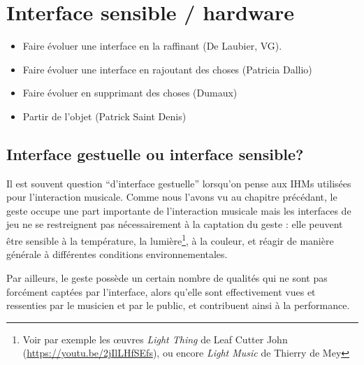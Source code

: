 %
\chapter{Interface sensible / hardware}
\label{ch:interfaces}



\vspace{-1em}
\begin{itemize}[noitemsep]
\item Faire évoluer une interface en la raffinant (De Laubier, VG).
\item Faire évoluer une interface en rajoutant des choses (Patricia Dallio)
\item Faire évoluer en supprimant des choses (Dumaux)
\item Partir de l'objet (Patrick Saint Denis)
\end{itemize}

\section{Interface gestuelle ou interface sensible?}
Il est souvent question ``d'interface gestuelle'' lorsqu'on pense aux \glspl{IHM} utilisées pour l'interaction musicale. Comme nous l'avons vu au chapitre précédant, le geste occupe une part importante de l'interaction musicale mais les interfaces de jeu ne se restreignent pas nécessairement à la captation du geste : elle peuvent être sensible à la température, la lumière\footnote{Voir par exemple les œuvres \textit{Light Thing} de Leaf Cutter John (\url{https://youtu.be/2jIlLHfSEfs}), ou encore \textit{Light Music} de Thierry de Mey}, à la couleur, et réagir de manière générale à différentes conditions environnementales.

Par ailleurs, le geste possède un certain nombre de qualités qui ne sont pas forcément captées par l'interface, alors qu'elle sont effectivement vues et ressenties par le musicien et par le public, et contribuent ainsi à la performance.

